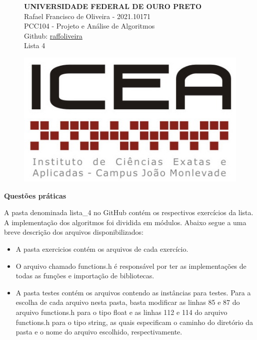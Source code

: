 \documentclass[12pt,a4paper]{article}
\begin{document}
\begin{figure}[H]
\begin{minipage}[]{0.07\linewidth}
	\end{minipage}
\hfill
	\begin{minipage}[]{0.6\linewidth}
		\centering
	\textbf{UNIVERSIDADE FEDERAL DE OURO PRETO\\}
		Rafael Francisco de Oliveira - 2021.10171\\
		PCC104 - Projeto e Análise de Algoritmos\\
		Github: \href{https://github.com/raffoliveira/Master_Degree}{raffoliveira}\\
		Lista 4
		
	\end{minipage}
\hfill	
	\begin{minipage}[c]{0.15\linewidth}
	\includegraphics[width=\linewidth]{images/icea.jpg}	
	\end{minipage}

\vspace{0.5cm}
\hrulefill
\end{figure}

{\Large \textbf{Questões práticas}}

\vspace{0.5cm}

A pasta denominada \textsf{lista\_4} no GitHub contém os respectivos exercícios da lista. A implementação dos algoritmos foi dividida em módulos. Abaixo segue a uma breve descrição dos arquivos disponibilizados:

\begin{itemize}
	\item A pasta \textsf{exercicios} contém os arquivos de cada exercício.
	\item O arquivo chamado \textsf{functions.h} é responsável por ter as implementações de todas as funções e importação de bibliotecas. 
	\item A pasta \textsf{testes} contém os arquivos contendo as instâncias para testes. Para a escolha de cada arquivo nesta pasta, basta modificar as linhas \textsf{85} e \textsf{87} do arquivo \textsf{functions.h}  para o tipo \textsf{float} e as linhas \textsf{112} e \textsf{114} do arquivo \textsf{functions.h}  para o tipo \textsf{string}, as quais especificam o caminho do diretório da pasta e o nome do arquivo escolhido, respectivamente. 
\end{itemize}
\end{document}
